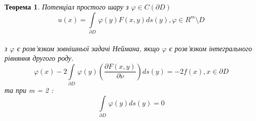 \documentclass[a4 paper,12pt,ukrainian]{report}
\newtheorem{theorem}{\textbf{Теорема}}[chapter]
\begin{document}
\begin{theorem}\cite{Kress}
Потенціал простого шару з $\varphi \in C(\partial D)$
\begin{equation*}
u(x) = \int\limits_{\partial D} \, \varphi(y) F(x,y)ds(y), \varphi \in R^m \setminus D
\end{equation*}
\\ з $\varphi$ є розв'язком зовнішньої задачі Неймана, якщо $\varphi$ є розв'язком інтегрального рівняння другого роду.
\begin{equation}
\varphi(x) - 2\int\limits_{\partial D} \, \varphi(y) (\frac{\partial F(x,y)}{\partial \nu})ds(y) = -2f(x), x \in \partial D
\end{equation}
та при m = 2 :
\begin{equation}
\int\limits_{\partial D} \, \varphi(y) ds(y) = 0
\end{equation}
\end{theorem}
\end{document}
